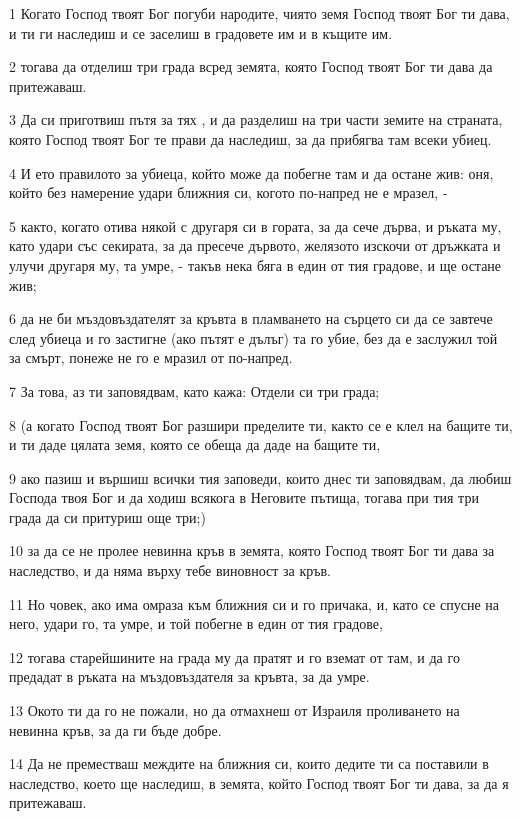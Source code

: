 \par 1 Когато Господ твоят Бог погуби народите, чиято земя Господ твоят Бог ти дава, и ти ги наследиш и се заселиш в градовете им и в къщите им.
\par 2 тогава да отделиш три града всред земята, която Господ твоят Бог ти дава да притежаваш.
\par 3 Да си приготвиш пътя за тях , и да разделиш на три части земите на страната, която Господ твоят Бог те прави да наследиш, за да прибягва там всеки убиец.
\par 4 И ето правилото за убиеца, който може да побегне там и да остане жив: оня, който без намерение удари ближния си, когото по-напред не е мразел, -
\par 5 както, когато отива някой с другаря си в гората, за да сече дърва, и ръката му, като удари със секирата, за да пресече дървото, желязото изскочи от дръжката и улучи другаря му, та умре, - такъв нека бяга в един от тия градове, и ще остане жив;
\par 6 да не би мъздовъздателят за кръвта в пламването на сърцето си да се завтече след убиеца и го застигне (ако пътят е дълъг) та го убие, без да е заслужил той за смърт, понеже не го е мразил от по-напред.
\par 7 За това, аз ти заповядвам, като кажа: Отдели си три града;
\par 8 (а когато Господ твоят Бог разшири пределите ти, както се е клел на бащите ти, и ти даде цялата земя, която се обеща да даде на бащите ти,
\par 9 ако пазиш и вършиш всички тия заповеди, които днес ти заповядвам, да любиш Господа твоя Бог и да ходиш всякога в Неговите пътища, тогава при тия три града да си притуриш още три;)
\par 10 за да се не пролее невинна кръв в земята, която Господ твоят Бог ти дава за наследство, и да няма върху тебе виновност за кръв.
\par 11 Но човек, ако има омраза към ближния си и го причака, и, като се спусне на него, удари го, та умре, и той побегне в един от тия градове,
\par 12 тогава старейшините на града му да пратят и го вземат от там, и да го предадат в ръката на мъздовъздателя за кръвта, за да умре.
\par 13 Окото ти да го не пожали, но да отмахнеш от Израиля проливането на невинна кръв, за да ги бъде добре.
\par 14 Да не преместваш междите на ближния си, които дедите ти са поставили в наследство, което ще наследиш, в земята, който Господ твоят Бог ти дава, за да я притежаваш.
